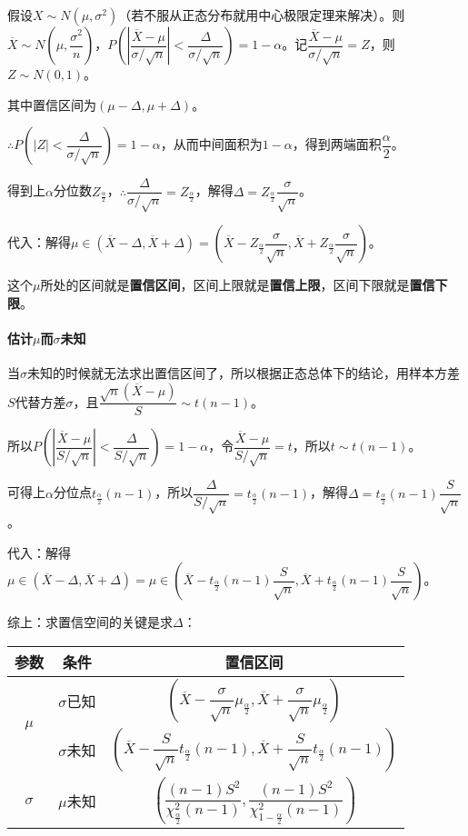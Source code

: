 \documentclass[UTF8, 12pt]{ctexart}
\begin{document}
假设$X\sim N(\mu,\sigma^2)$（若不服从正态分布就用中心极限定理来解决）。则$\overline{X}\sim N\left(\mu,\dfrac{\sigma^2}{n}\right)$，$P\left(\left\vert\dfrac{\overline{X}-\mu}{\sigma/\sqrt{n}}\right\vert<\dfrac{\Delta}{\sigma/\sqrt{n}}\right)=1-\alpha$。记$\dfrac{\overline{X}-\mu}{\sigma/\sqrt{n}}=Z$，则$Z\sim N(0,1)$。

其中置信区间为$(\mu-\Delta,\mu+\Delta)$。

$\therefore P\left(\vert Z\vert<\dfrac{\Delta}{\sigma/\sqrt{n}}\right)=1-\alpha$，从而中间面积为$1-\alpha$，得到两端面积$\dfrac{\alpha}{2}$。

得到上$\alpha$分位数$Z_\frac{\alpha}{2}$，$\therefore\dfrac{\Delta}{\sigma/\sqrt{n}}=Z_\frac{\alpha}{2}$，解得$\Delta=Z_\frac{\alpha}{2}\dfrac{\sigma}{\sqrt{n}}$。

代入：解得$\mu\in(\overline{X}-\Delta,\overline{X}+\Delta)=(\overline{X}-Z_\frac{\alpha}{2}\dfrac{\sigma}{\sqrt{n}},\overline{X}+Z_\frac{\alpha}{2}\dfrac{\sigma}{\sqrt{n}})$。

这个$\mu$所处的区间就是\textbf{置信区间}，区间上限就是\textbf{置信上限}，区间下限就是\textbf{置信下限}。

\paragraph{\texorpdfstring{估计$\mu$而$\sigma$未知}{}} \leavevmode \medskip

当$\sigma$未知的时候就无法求出置信区间了，所以根据正态总体下的结论，用样本方差$S$代替方差$\sigma$，且$\dfrac{\sqrt{n}(\overline{X}-\mu)}{S}\sim t(n-1)$。

所以$P\left(\left\vert\dfrac{\overline{X}-\mu}{S/\sqrt{n}}\right\vert<\dfrac{\Delta}{S/\sqrt{n}}\right)=1-\alpha$，令$\dfrac{\overline{X}-\mu}{S/\sqrt{n}}=t$，所以$t\sim t(n-1)$。

可得上$\alpha$分位点$t_\frac{\alpha}{2}(n-1)$，所以$\dfrac{\Delta}{S/\sqrt{n}}=t_\frac{\alpha}{2}(n-1)$，解得$\Delta=t_\frac{\alpha}{2}(n-1)\dfrac{S}{\sqrt{n}}$。

代入：解得$\mu\in(\overline{X}-\Delta,\overline{X}+\Delta)=\mu\in(\overline{X}-t_\frac{\alpha}{2}(n-1)\dfrac{S}{\sqrt{n}},\overline{X}+t_\frac{\alpha}{2}(n-1)\dfrac{S}{\sqrt{n}})$。

综上：求置信空间的关键是求$\Delta$：\medskip

\begin{tabular}{|c|c|c|}
    \hline
    参数 & 条件 & 置信区间 \\ \hline
    \multirow{2}{*}{$\mu$} & $\sigma$已知 & $\left(\overline{X}-\dfrac{\sigma}{\sqrt{n}}\mu_{\frac{\alpha}{2}},\overline{X}+\dfrac{\sigma}{\sqrt{n}}\mu_{\frac{\alpha}{2}}\right)$ \\ \cline{2-3}
    & $\sigma$未知 & $\left(\overline{X}-\dfrac{S}{\sqrt{n}}t_{\frac{\alpha}{2}}(n-1),\overline{X}+\dfrac{S}{\sqrt{n}}t_{\frac{\alpha}{2}}(n-1)\right)$ \\ \hline
    $\sigma$ & $\mu$未知 &  $\left(\dfrac{(n-1)S^2}{\chi^2_{\frac{\alpha}{2}}(n-1)},\dfrac{(n-1)S^2}{\chi^2_{1-\frac{\alpha}{2}}(n-1)}\right)$ \\ \hline
\end{tabular}
\end{document}
